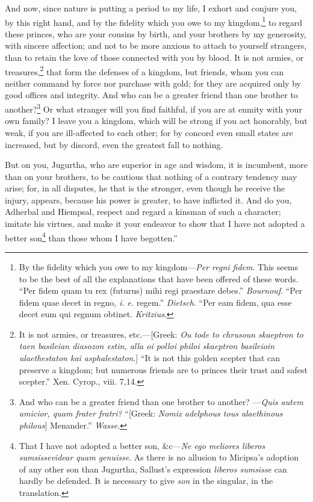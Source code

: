 And now, since nature is putting a period to my life, I exhort and
conjure you, by this right hand, and by the fidelity which you owe to
my kingdom,\footnote{By the fidelity which you owe to my kingdom—\emph{Per regni
fidem}. This seems to be the best of all the explanations that have
been offered of these words. ``Per fidem quam tu rex (futurus) mihi
regi praestare debes.'' \emph{Bournouf}. ``Per fidem quae decet in regno, \emph{i.
e.} regem.'' \emph{Dietsch}. ``Per eam fidem, qua esse decet eum qui regnum
obtinet. \emph{Kritzius}.} to regard these princes, who are your cousins by
birth, and your brothers by my generosity, with sincere affection; and
not to be more anxious to attach to yourself strangers, than to retain
the love of those connected with you by blood. It is not armies, or
treasures,\footnote{It is not armies, or treasures, etc.—[Greek: \emph{Ou tode to
chrusoun skaeptron to taen basileian diasozon estin, alla oi polloi
philoi skaeptron basileioin ulaethestaton kai asphalestaton}.] ``It is
not this golden scepter that can preserve a kingdom; but numerous
friends are to princes their trust and safest scepter.'' Xen. Cyrop.,
viii. 7,14.} that form the defenses of a kingdom, but friends, whom
you can neither command by force nor purchase with gold; for they are
acquired only by good offices and integrity. And who can be a greater
friend than one brother to another?\footnote{And who can be a greater friend than one brother to another?
—\emph{Quis autem amicior, quam frater fratri?} ``[Greek: \emph{Nomiz
adelphous tous alaethinous philous}] Menander.'' \emph{Wasse}.} Or what stranger will you find
faithful, if you are at enmity with your own family? I leave you a
kingdom, which will be strong if you act honorably, but weak, if you
are ill-affected to each other; for by concord even small states are
increased, but by discord, even the greatest fall to nothing.

But on you, Jugurtha, who are superior in age and wisdom, it is
incumbent, more than on your brothers, to be cautious that nothing of
a contrary tendency may arise; for, in all disputes, he that is the
stronger, even though he receive the injury, appears, because his
power is greater, to have inflicted it. And do you, Adherbal and
Hiempsal, respect and regard a kinsman of such a character; imitate
his virtues, and make it your endeavor to show that I have not adopted
a better son\footnote{That I have not adopted a better son, \&c—\emph{Ne ego meliores
liberos sumsissevidear quam genuisse}. As there is no allusion to
Micipsa's adoption of any other son than Jugurtha, Sallust's
expression \emph{liberos sumsisse} can hardly be defended. It is necessary
to give \emph{son} in the singular, in the translation.} than those whom I have begotten.''

